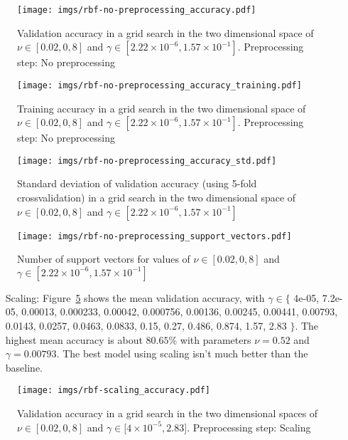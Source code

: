\documentclass[format=acmtog]{acmart}
\begin{document}
\begin{figure}
\centering
\texttt{[image: imgs/rbf-no-preprocessing\_accuracy.pdf]}
\caption{Validation accuracy in a grid search in the two dimensional
space of \(\nu \in [0.02,0,8]\) and
\(\gamma \in [2.22\times{}10^{-6}, 1.57\times{}10^{-1}]\). Preprocessing
step: No preprocessing \label{rbf-no-preprocessing_accuracy}}
\end{figure}

\begin{figure}
\centering
\texttt{[image: imgs/rbf-no-preprocessing\_accuracy\_training.pdf]}
\caption{Training accuracy in a grid search in the two dimensional space
of \(\nu \in [0.02,0,8]\) and
\(\gamma \in [2.22\times{}10^{-6}, 1.57\times{}10^{-1}]\). Preprocessing
step: No preprocessing \label{rbf-no-preprocessing_accuracy_training}}
\end{figure}

\begin{figure}
\centering
\texttt{[image: imgs/rbf-no-preprocessing\_accuracy\_std.pdf]}
\caption{Standard deviation of validation accuracy (using 5-fold
crossvalidation) in a grid search in the two dimensional space of
\(\nu \in [0.02,0,8]\) and
\(\gamma \in [2.22\times{}10^{-6}, 1.57\times{}10^{-1}]\)
\label{rbf-no-preprocessing_accuracy_std}}
\end{figure}

\begin{figure}
\centering
\texttt{[image: imgs/rbf-no-preprocessing\_support\_vectors.pdf]}
\caption{Number of support vectors for values of \(\nu \in [0.02,0,8]\)
and \(\gamma \in [2.22\times{}10^{-6}, 1.57\times{}10^{-1}]\)
\label{rbf-no-preprocessing_support_vectors}}
\end{figure}

\begin{itemize}
  \item[Scaling:] Figure~\ref{rbf-scaling_accuracy} shows the mean validation accuracy,
  with $\gamma \in \{$ 4e-05, 7.2e-05, 0.00013, 0.000233, 0.00042, 0.000756, 0.00136,
  0.00245, 0.00441, 0.00793, 0.0143, 0.0257, 0.0463, 0.0833, 0.15, 0.27, 0.486, 0.874,
  1.57, 2.83 $\}$.
  The highest mean accuracy is about $80.65\%$ with parameters $\nu = 0.52$ and $\gamma = 0.00793$.
  The best model using scaling isn't much better than the baseline.
\end{itemize}

\begin{figure}
\centering
\texttt{[image: imgs/rbf-scaling\_accuracy.pdf]}
\caption{Validation accuracy in a grid search in the two dimensional
spaces of \(\nu \in [0.02,0,8]\) and
\(\gamma \in [4\times{}10^{-5}, 2.83\){]}. Preprocessing step: Scaling
\label{rbf-scaling_accuracy}}
\end{figure}
\end{document}
